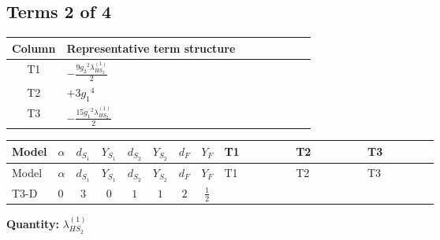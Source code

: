 \documentclass[8pt]{article}
\begin{document}
\begin{landscape}
\subsection*{Terms 2 of 4}
\begin{center}
\begin{tabular}{@{}c >{\raggedright\arraybackslash}p{0.82\linewidth}@{}}
\toprule
Column & Representative term structure \\
\midrule
T1 & \(\displaystyle -\frac{9 {g_2}^2 {\lambda_{HS_2}^{(1)}}}{2}\) \\
\midrule
T2 & \(\displaystyle +3 {g_1}^4\) \\
\midrule
T3 & \(\displaystyle -\frac{15 {g_1}^2 {\lambda_{HS_2}^{(1)}}}{2}\) \\
\midrule
\bottomrule
\end{tabular}
\end{center}
\smallskip
\tiny
\begin{longtable}{@{}llcccccc >{\raggedright\arraybackslash}p{0.21\linewidth} >{\raggedright\arraybackslash}p{0.21\linewidth} >{\raggedright\arraybackslash}p{0.21\linewidth}@{}}
\toprule
Model & $\alpha$ & $d_{S_1}$ & $Y_{S_1}$ & $d_{S_2}$ & $Y_{S_2}$ & $d_F$ & $Y_F$ & T1 & T2 & T3 \\
\midrule
\endfirsthead
\toprule
Model & $\alpha$ & $d_{S_1}$ & $Y_{S_1}$ & $d_{S_2}$ & $Y_{S_2}$ & $d_F$ & $Y_F$ & T1 & T2 & T3 \\
\midrule
\endhead
T3-D & $0$ & $3$ & $0$ & $1$ & $1$ & $2$ & $\frac{1}{2}$ & \scriptsize\adjustbox{max width=\linewidth}{$\begin{gathered} -\frac{9 {g_2}^2 {\lambda_{HS_2}^{(1)}}}{2}\end{gathered}$} & \scriptsize\adjustbox{max width=\linewidth}{$\begin{gathered} +3 {g_1}^4\end{gathered}$} & \scriptsize\adjustbox{max width=\linewidth}{$\begin{gathered} -\frac{15 {g_1}^2 {\lambda_{HS_2}^{(1)}}}{2}\end{gathered}$} \\
\midrule
\bottomrule
\end{longtable}
\clearpage
\noindent\textbf{Quantity: }$\lambda_{HS_2}^{(1)}$\par\smallskip

\end{landscape}
\end{document}
